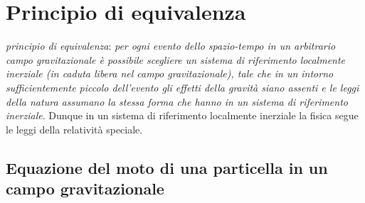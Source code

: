 \cleardoublepage
\chapter{Principio di equivalenza}
\label{cha:principio-equivalenza}


\emph{principio di equivalenza}:
\emph{per ogni evento dello spazio-tempo in un arbitrario campo gravitazionale è
  possibile scegliere un sistema di riferimento \emph{localmente inerziale} (in
  caduta libera nel campo gravitazionale), tale che in un intorno
  sufficientemente piccolo dell'evento gli effetti della gravità siano assenti e
  le leggi della natura assumano la stessa forma che hanno in un sistema di
  riferimento inerziale}.
Dunque in un sistema di riferimento localmente inerziale la fisica segue le
leggi della relatività speciale.

\section{Equazione del moto di una particella in un campo gravitazionale}
\label{sec:equazione-moto}

